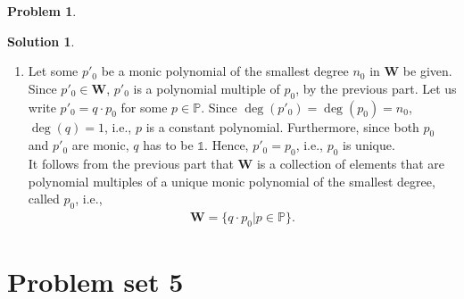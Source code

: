 \documentclass{book}
\theoremstyle{definition}
\newtheorem*{prob*}{Problem}
\newtheorem*{sln*}{Solution}
\newcommand{\W}{\mathbf{W}}
\begin{document}
\begin{prob*}
\begin{sln*}
\begin{enumerate}
		
		\item Let some $p'_0$ be a monic polynomial of the smallest degree $n_0$ in $\W$ be given. Since $p'_0 \in \W$, $p'_0$ is a polynomial multiple of $p_0$, by the previous part. Let us write $p'_0 = q\cdot p_0$ for some $p\in \mathbb{P}$. Since $\deg(p'_0) = \deg(p_0) = n_0$, $\deg(q) = 1$, i.e., $p$ is a constant polynomial. Furthermore, since both $p_0$ and $p'_0$ are monic, $q$ has to be $\mathbb{1}$. Hence, $p'_0 = p_0$, i.e., $p_0$ is unique.\\
		
		It follows from the previous part that $\W$ is a collection of elements that are polynomial multiples of a unique monic polynomial of the smallest degree, called $p_0$, i.e.,
		\begin{align*}
		\W = \{ q\cdot p_0 \big\vert p \in \mathbb{P} \}.
		\end{align*}
	\end{enumerate}
\end{sln*}
\end{prob*}






















\newpage














\section{Problem set 5}
\end{document}
